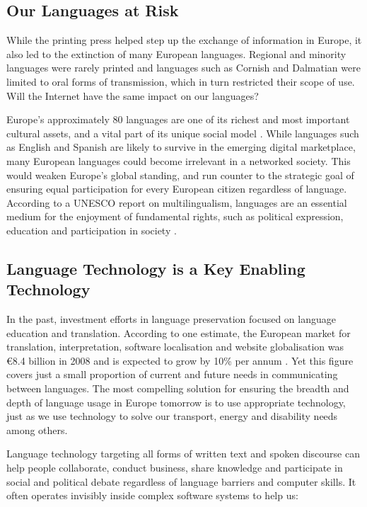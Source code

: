 \documentclass[]{../../metanetpaper}
\begin{document}
\begin{multicols}{2}
\subsection{Our Languages at Risk}

While the printing press helped step up the exchange of information in Europe, it also led to the extinction of many European languages. Regional and minority languages were rarely printed and languages such as Cornish and Dalmatian were limited to oral forms of transmission, which in turn restricted their scope of use. Will the Internet have the same impact on our languages?


Europe's approximately 80 languages are one of its richest and most important
cultural assets, and a vital part of its unique social model \cite{EC2}. While
languages such as English and Spanish are likely to survive in the emerging
digital marketplace, many European languages could become irrelevant in a
networked society. This would weaken Europe's global standing, and run counter
to the strategic goal of ensuring equal participation for every European
citizen regardless of language. According to a UNESCO report on
multilingualism, languages are an essential medium for the enjoyment of
fundamental rights, such as political expression, education and participation
in society \cite{Unesco1}.

\subsection{Language Technology is a Key Enabling Technology}

In the past, investment efforts in language preservation focused on language
education and translation. According to one estimate, the European market for
translation, interpretation, software localisation and website globalisation
was €8.4 billion in 2008 and is expected to grow by 10\% per annum
\cite{EC3}. Yet this figure covers just a small proportion of current and
future needs in communicating between languages. The most compelling solution
for ensuring the breadth and depth of language usage in Europe tomorrow is to
use appropriate technology, just as we use technology to solve our transport,
energy and disability needs among others.

Language technology targeting all forms of written text and spoken
discourse can help people collaborate, conduct business, share knowledge and
participate in social and political debate regardless of language barriers and
computer skills. It often operates invisibly inside complex software systems
to help us:


\end{multicols}
\end{document}
